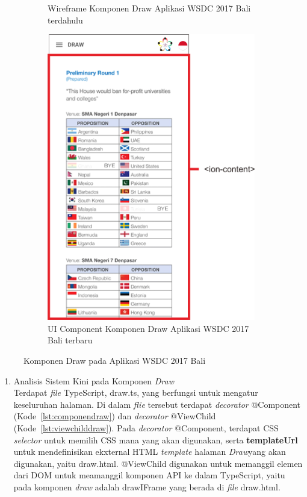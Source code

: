 \begin{enumerate}
\begin{figure}[H]
\begin{subfigure}[b]{0.43\textwidth}
         	\caption{Wireframe Komponen Draw Aplikasi WSDC 2017 Bali terdahulu}
         	\label{fig:drawPageWireframe}
     	\end{subfigure}
     	\hspace*{0.5in}
     	\begin{subfigure}[b]{0.43\textwidth}
         	\centering
         	\includegraphics[scale=0.4]{Gambar/DrawPageKini.png}
         	\caption{UI Component Komponen Draw Aplikasi WSDC 2017 Bali terbaru}
         	\label{fig:DrawPageKini}
     	\end{subfigure}
        \caption{Komponen Draw pada Aplikasi WSDC 2017 Bali}
        \label{fig:UIComponent1}
	\end{figure}
	\begin{enumerate}
		\item Analisis Sistem Kini pada Komponen \textit{Draw} \\
		Terdapat \textit{file} TypeScript, draw.ts, yang berfungsi untuk mengatur keseluruhan halaman. Di dalam \textit{flie} tersebut terdapat \textit{decorator} @Component (Kode~\ref{lst:componendraw}) dan \textit{decorator} @ViewChild (Kode~\ref{lst:viewchilddraw}). Pada \textit{decorator} @Component, terdapat CSS \textit{selector} untuk memilih CSS mana yang akan digunakan, serta \textbf{templateUrl} untuk mendefinisikan ekxternal HTML \textit{template} halaman \textit{Draw}yang akan digunakan, yaitu draw.html. @ViewChild digunakan untuk memanggil elemen dari DOM untuk meamanggil komponen API ke dalam TypeScript, yaitu pada komponen \textit{draw} adalah drawIFrame yang berada di \textit{file} draw.html.

\end{enumerate}
\end{enumerate}
